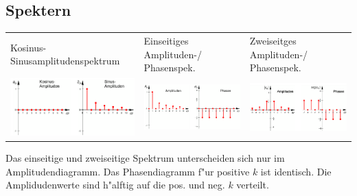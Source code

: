    \subsection{Spektern}
   	\begin{tabular}{p{6cm} p{6cm} p{6cm}}
   		Kosinus- Sinusamplitudenspektrum & 
   		Einseitiges Amplituden-/ Phasenspek. &
   		Zweiseitges Amplituden-/ Phasenspek. \\
   		\includegraphics[width=5cm]{Content/Transformationen/cosSinSpectr.png} &
   		\includegraphics[width=5cm]{Content/Transformationen/EinseitigSpectr.png} &
   		\includegraphics[width=5cm]{Content/Transformationen/ZweiseitigSpectr.png}
   	\end{tabular}
   	Das einseitige und zweiseitige Spektrum unterscheiden sich nur im
  	Amplitudendiagramm. Das Phasendiagramm f"ur positive $k$ ist identisch. Die
  	Amplidudenwerte sind h"alftig auf die pos. und neg. $k$ verteilt.
 